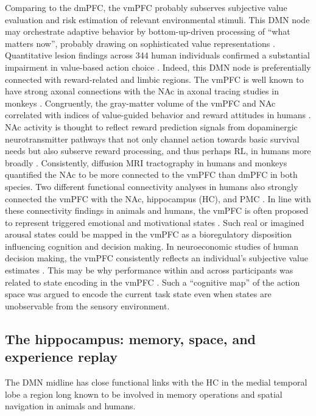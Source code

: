 \documentclass[10pt,letterpaper]{article}
\begin{document}
Comparing to the dmPFC,
the vmPFC probably subserves
subjective value evaluation and
risk estimation of relevant environmental stimuli.
This DMN node may
orchestrate adaptive behavior by bottom-up-driven
processing of “what matters now”,
probably drawing on sophisticated value representations
\citep{rolls_OFC, doherty2015structure}.
Quantitative lesion findings across 344 human individuals confirmed
a substantial impairment in value-based action choice
\citep{glascher2012lesion}.
Indeed,
this DMN node is preferentially connected with reward-related and limbic regions.
The vmPFC is well known to have strong axonal connections
with the NAc
in axonal tracing studies in monkeys \citep{haber1995orbital}.
Congruently, the gray-matter volume of the vmPFC and NAc
correlated with indices of value-guided behavior and reward attitudes
in humans
\citep{lebreton2009automatic}.
NAc activity is thought to reflect reward prediction signals
from dopaminergic neurotransmitter pathways
\citep{schultz1998predictive}
that not only channel action towards basic survival needs but also
subserve reward processing, and thus perhaps RL,
in humans more broadly \citep{doherty2015structure}.
Consistently, diffusion MRI tractography in humans and monkeys
\citep{croxson2005quantitative}
quantified the NAc to
be more connected to the vmPFC than dmPFC in both species.
Two different functional connectivity analyses in humans also strongly connected
the vmPFC with the NAc, hippocampus (HC),
and PMC \citep{bzdok2015subspecialization}.
%
In line with these connectivity findings in animals and humans,
the vmPFC is often proposed to represent triggered
emotional and motivational states \citep{damasio1996somatic}.
Such real or imagined arousal states could be mapped in the vmPFC
as a bioregulatory disposition influencing cognition
and decision making.
In neuroeconomic studies of human decision making,
the vmPFC consistently reflects an individual’s subjective
value estimates
\citep{behrens2008associative}.
This may be why performance within and across participants
was related to state encoding in the vmPFC \citep{Schuck2016}.
Such a ``cognitive map'' of the action space was argued to encode
the current task state even when states are unobservable from the sensory environment.



\subsection{The hippocampus: memory, space, and experience replay}
The DMN midline has close functional links
with the HC in the medial temporal lobe \citep{vincet2006, shannon2013morning} \textemdash
a region long known to be involved in
memory operations and spatial navigation in animals and humans.
\end{document}
